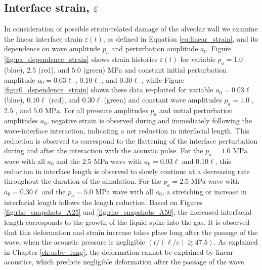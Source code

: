 \subsection{Interface strain, $\varepsilon$}
In consideration of possible strain-related damage of the alveolar
wall we examine the linear interface strain $\varepsilon(t)$, as
defined in Equation \eqref{eq:linear_strain}, and its dependence on
wave amplitude $p_a$ and perturbation amplitude $a_0$. Figure
\ref{fig:pa_dependence_strain} shows strain histories $\varepsilon(t)$
for variable $p_a = 1.0$ (blue), $2.5$ (red), and $5.0$ (green) MPa
and constant initial perturbation amplitude $a_0=0.03\ell$
, $0.10\ell$
, and $0.30\ell$
, while Figure
\ref{fig:a0_dependence_strain} shows these data re-plotted for
variable $a_0 = 0.03\ell$ (blue), $0.10\ell$ (red), and $0.30\ell$
(green) and constant wave amplitudes $p_a=1.0$
, $2.5$
, and $5.0$
 MPa. For all pressure amplitudes
$p_a$ and initial perturbation amplitudes $a_0$, negative strain is
observed during and immediately following the wave-interface
interaction, indicating a net reduction in interfacial length. This
reduction is observed to correspond to the flattening of the interface
perturbation during and after the interaction with the acoustic
pulse. For the $p_a = 1.0$ MPa wave with all $a_0$ and the $2.5$ MPa
wave with $a_0 = 0.03\ell$ and $0.10\ell$, this reduction in interface
length is observed to slowly continue at a decreasing rate throughout
the duration of the simulation. For the $p_a = 2.5$ MPa wave with
$a_0 = 0.30\ell$ and the $p_a = 5.0$ MPa wave with all $a_0$, a
stretching or increase in interfacial length follows the length
reduction. Based on Figures \ref{fig:rho_snapshots_A25} and
\ref{fig:rho_snapshots_A50}, the increased interfacial length
corresponds to the growth of the liquid spike into the gas. It is
observed that this deformation and strain increase takes place long
after the passage of the wave, when the acoustic pressure is
negligible $\left(t/(\ell/c)\gtrsim 47.5\right)$. As explained in
Chapter \ref{ch:usbe_lung}, the deformation cannot be explained by
linear acoustics, which predicts negligible deformation after the
passage of the wave.

